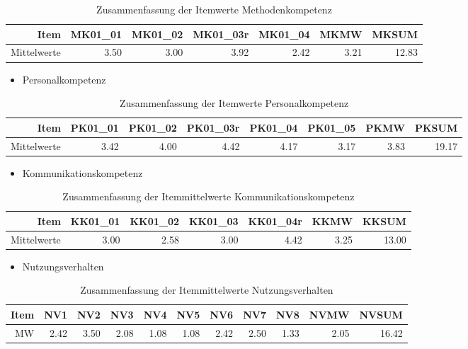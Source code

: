 \documentclass[12pt, bibliography=totoc]{scrartcl}
\begin{document}
\begin{table}[H]
\centering
\caption{Zusammenfassung der Itemwerte Methodenkompetenz}
\begin{tabular}{rrrrrrr}
  \hline
 Item & MK01\_01 & MK01\_02 & MK01\_03r & MK01\_04 & MKMW & MKSUM \\
  \hline
Mittelwerte & 3.50 & 3.00 & 3.92 & 2.42 & 3.21 & 12.83 \\
   \hline
\end{tabular}
\end{table}

\begin{itemize}
\tightlist
\item
  Personalkompetenz
\end{itemize}

\begin{table}[H]
\centering
\caption{Zusammenfassung der Itemwerte Personalkompetenz}
\begin{tabular}{rrrrrrrr}
  \hline
 Item & PK01\_01 & PK01\_02 & PK01\_03r & PK01\_04 & PK01\_05 & PKMW & PKSUM \\
  \hline
Mittelwerte & 3.42 & 4.00 & 4.42 & 4.17 & 3.17 & 3.83 & 19.17 \\
   \hline
\end{tabular}
\end{table}

\begin{itemize}
\tightlist
\item
  Kommunikationskompetenz
\end{itemize}

\begin{table}[H]
\centering
\caption{Zusammenfassung der Itemmittelwerte Kommunikationskompetenz}
\begin{tabular}{rrrrrrr}
  \hline
 Item & KK01\_01 & KK01\_02 & KK01\_03 & KK01\_04r & KKMW & KKSUM \\
  \hline
Mittelwerte & 3.00 & 2.58 & 3.00 & 4.42 & 3.25 & 13.00 \\
   \hline
\end{tabular}
\end{table}

\begin{itemize}
\tightlist
\item
  Nutzungsverhalten
\end{itemize}

\begin{table}[H]
\centering
\caption{Zusammenfassung der Itemmittelwerte Nutzungsverhalten}
\begin{tabular}{rrrrrrrrrrr}
  \hline
 Item & NV1 & NV2 & NV3 & NV4 & NV5 & NV6 & NV7 & NV8 & NVMW & NVSUM \\
  \hline
MW & 2.42 & 3.50 & 2.08 & 1.08 & 1.08 & 2.42 & 2.50 & 1.33 & 2.05 & 16.42 \\
   \hline
\end{tabular}
\end{table}
\end{document}
